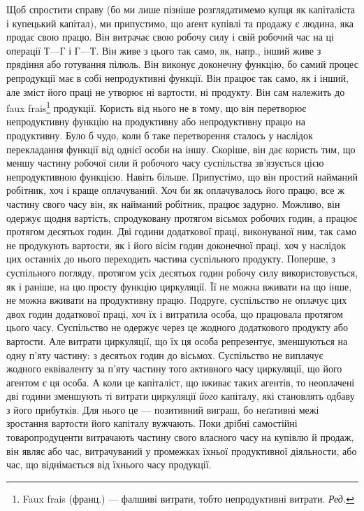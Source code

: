 Щоб спростити справу (бо ми лише пізніше розглядатимемо купця
як капіталіста і купецький капітал), ми припустимо, що аґент купівлі та
продажу є людина, яка продає свою працю. Він витрачає свою робочу
силу і свій робочий час на ці операції $Т — Г$ і $Г — Т$. Він живе з цього
так само, як, напр., інший живе з прядіння або готування пілюль. Він
виконує доконечну функцію, бо самий процес репродукції має в собі
непродуктивні функції. Він працює так само, як і інший, але зміст його
праці не утворює ні вартости, ні продукту. Він сам належить до faux
frais\footnote*{
Faux frais (франц.) — фалшиві витрати, тобто непродуктивні витрати. \emph{Ред.}
} продукції. Користь від нього не в тому, що він перетворює
непродуктивну функцію на продуктивну або непродуктивну працю на
продуктивну. Було б чудо, коли б таке перетворення сталось у наслідок
перекладання функції від однієї особи на іншу. Скоріше, він дає користь
тим, що меншу частину робочої сили й робочого часу суспільства
зв’язується цією непродуктивною функцією. Навіть більше. Припустімо,
що він простий найманий робітник, хоч і краще оплачуваний.
Хоч би    як оплачувалось його працю, все ж частину свого часу
він, як    найманий робітник, працює    задурно. Можливо, він
одержує щодня вартість, спродуковану протягом вісьмох робочих годин, а
працює протягом десятьох годин. Дві години додаткової праці, виконуваної
ним, так само не продукують вартости, як і його вісім годин
доконечної праці, хоч у наслідок цих останніх до нього переходить
частина суспільного продукту. Поперше, з суспільного погляду, протягом
усіх десятьох годин робочу силу використовується, як і раніше, на цю
просту функцію циркуляції. Її не можна вживати на що інше, не
можна вживати на продуктивну працю. Подруге, суспільство не оплачує
цих двох годин додаткової праці, хоч їх і витратила особа, що
працювала протягом цього часу. Суспільство не одержує через це жодного
додаткового продукту або вартости. Але витрати циркуляції, що їх
ця особа репрезентує, зменшуються на одну п’яту частину: з десятьох
годин до вісьмох. Суспільство не виплачує жодного еквіваленту за п’яту
частину того активного часу циркуляції, що його агентом є ця особа.
А коли це капіталіст, що вживає таких агентів, то неоплачені дві години
зменшують ті витрати циркуляції \emph{його} капіталу, які становлять одбаву з його
прибутків. Для нього це — позитивний виграш, бо неґативні межі зростання
вартости його капіталу вужчають. Поки дрібні самостійні товаропродуценти
витрачають частину свого власного часу на купівлю й продаж,
він являє або час, витрачуваний у промежках їхньої продуктивної
діяльности, або час, що віднімається від їхнього часу продукції.

